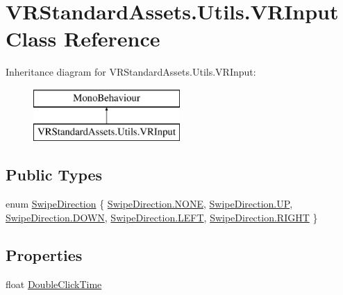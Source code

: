 \hypertarget{class_v_r_standard_assets_1_1_utils_1_1_v_r_input}{}\section{V\+R\+Standard\+Assets.\+Utils.\+V\+R\+Input Class Reference}
\label{class_v_r_standard_assets_1_1_utils_1_1_v_r_input}
Inheritance diagram for V\+R\+Standard\+Assets.\+Utils.\+V\+R\+Input\+:\begin{figure}[H]
\begin{center}
\leavevmode
\includegraphics[height=2.000000cm]{class_v_r_standard_assets_1_1_utils_1_1_v_r_input}
\end{center}
\end{figure}
\subsection*{Public Types}
\begin{DoxyCompactItemize}
\item 
enum \mbox{\hyperlink{class_v_r_standard_assets_1_1_utils_1_1_v_r_input_a2ea76769ddd926c08921d6684d332538}{Swipe\+Direction}} \{ \newline
\mbox{\hyperlink{class_v_r_standard_assets_1_1_utils_1_1_v_r_input_a2ea76769ddd926c08921d6684d332538ab50339a10e1de285ac99d4c3990b8693}{Swipe\+Direction.\+N\+O\+NE}}, 
\mbox{\hyperlink{class_v_r_standard_assets_1_1_utils_1_1_v_r_input_a2ea76769ddd926c08921d6684d332538afbaedde498cdead4f2780217646e9ba1}{Swipe\+Direction.\+UP}}, 
\mbox{\hyperlink{class_v_r_standard_assets_1_1_utils_1_1_v_r_input_a2ea76769ddd926c08921d6684d332538ac4e0e4e3118472beeb2ae75827450f1f}{Swipe\+Direction.\+D\+O\+WN}}, 
\mbox{\hyperlink{class_v_r_standard_assets_1_1_utils_1_1_v_r_input_a2ea76769ddd926c08921d6684d332538a684d325a7303f52e64011467ff5c5758}{Swipe\+Direction.\+L\+E\+FT}}, 
\newline
\mbox{\hyperlink{class_v_r_standard_assets_1_1_utils_1_1_v_r_input_a2ea76769ddd926c08921d6684d332538a21507b40c80068eda19865706fdc2403}{Swipe\+Direction.\+R\+I\+G\+HT}}
 \}
\end{DoxyCompactItemize}
\subsection*{Properties}
\begin{DoxyCompactItemize}
\item 
float \mbox{\hyperlink{class_v_r_standard_assets_1_1_utils_1_1_v_r_input_a57b4846b4cc61b8042ad0d2be88905a5}{Double\+Click\+Time}}
\end{DoxyCompactItemize}
